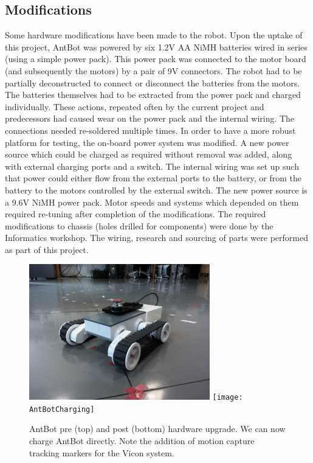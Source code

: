 \documentclass[a4paper,11pt,twoside,openright]{article}
\begin{document}
\subsection{Modifications}
Some hardware modifications have been made to the robot. Upon the uptake of this project, AntBot
was powered by six 1.2V AA NiMH batteries wired in series (using a simple power pack). This power
pack was connected to the motor board (and subsequently the motors) by a pair of 9V connectors. The robot
had to be partially deconstructed to connect or disconnect the batteries from the motors. The batteries themselves
had to be extracted from the power pack and charged individually. These actions, repeated often by the current
project and predecessors had caused wear on the power pack and the internal wiring. The connections
needed re-soldered multiple times. In order to have a more robust platform for testing, the on-board
power system was modified. 
A new power source which could be charged as required without removal was added, along with external
charging ports and a switch. The internal wiring was set up such that power could either flow from the
external ports to the battery, or from the battery to the motors controlled by the external switch. The new
power source is a 9.6V NiMH power pack. Motor speeds and systems which depended on them required re-tuning
after completion of the modifications. The required modifications to chassis (holes drilled for components)
were done by the Informatics workshop. The wiring, research and sourcing of parts were performed as part
of this project.

\begin{figure}
  \centering
  \includegraphics[width=0.7\textwidth]{AntBot}
  \texttt{[image: AntBotCharging]}
  \caption{
    \label{fig:antbotcomp} AntBot pre (top) and post (bottom) hardware upgrade. We can now charge
    AntBot directly. Note the addition of motion capture tracking markers for the Vicon system.
    }
\end{figure}
\newpage
\end{document}
